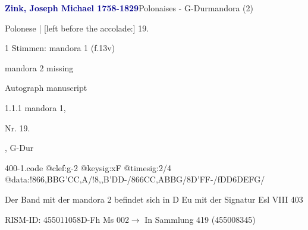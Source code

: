 \documentclass[twocolumn]{book}
\begin{document}
\par \vspace{7pt} \textcolor{darkblue}{\textbf{Zink, Joseph Michael  1758-1829}}\hfillplus{\textbf{[400]}}\newline Polonaises - G-Dur\newline mandora (2)
\par \begin{itshape}[f.13v, at left:] Polonese | [left before the accolade:] 19.\end{itshape} 
\par \textcolor{darkblue}{}  1 Stimmen: mandora 1  (f.13v)\newline \begin{small} mandora 2 missing\end{small} \newline Autograph manuscript
\par 1.1.1  mandora 1, \begin{itshape}Nr. 19.\end{itshape}, G-Dur  
\begin{filecontents*}{400-1.code}
@clef:g-2
@keysig:xF
@timesig:2/4
@data:!866{,BBG}{'CC,A}/!8,,B'DD-/866{CC,A}{BBG}/8D'FF-/fDD6DEFG/
\end{filecontents*}
\newline
%
\par Der Band mit der mandora 2 befindet sich in D Eu mit der Signatur Esl VIII 403
\par RISM-ID: 455011058\newline D-Fh  Ms 002\newline $\rightarrow$ In Sammlung 419 (455008345)
      
\end{document}
